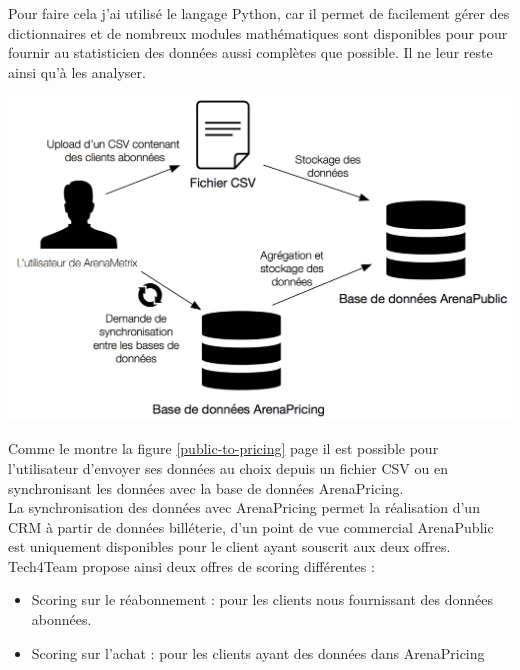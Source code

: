 Pour faire cela j'ai utilisé le langage Python, car il permet de facilement gérer des dictionnaires et de nombreux modules mathématiques sont disponibles pour pour fournir au statisticien des données aussi complètes que possible. Il ne leur reste ainsi qu'à les analyser.

\begin{center}
\includegraphics[scale=0.7]{images/public-to-pricing.png}
\label{public-to-pricing}
\end{center}

Comme le montre la figure \ref{public-to-pricing} page \pageref{public-to-pricing} il est possible pour l'utilisateur d'envoyer ses données au choix depuis un fichier CSV ou en synchronisant les données avec la base de données ArenaPricing. 
\\

La synchronisation des données avec ArenaPricing permet la réalisation d'un CRM à partir de données billéterie, d'un point de vue commercial ArenaPublic est uniquement disponibles pour le client ayant souscrit aux deux offres. 
\\

Tech4Team propose ainsi deux offres de scoring différentes : 

\begin{itemize}
  \item[\textbullet] Scoring sur le réabonnement : pour les clients nous fournissant des données abonnées. 
  \item[\textbullet] Scoring sur l'achat : pour les clients ayant des données dans ArenaPricing  
\end{itemize} 



